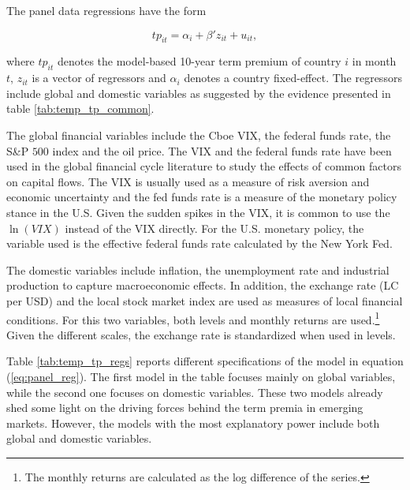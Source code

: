The panel data regressions have the form

\begin{equation} \label{eq:panel_reg}
	tp_{it} = \alpha_{i} + \beta' z_{it} + u_{it},
\end{equation}

where $tp_{it}$ denotes the model-based 10-year term premium of country $i$ in month $t$, $z_{it}$ is a vector of regressors and $\alpha_{i}$ denotes a country fixed-effect. The regressors include global and domestic variables as suggested by the evidence presented in table \ref{tab:temp_tp_common}.

The global financial variables include the Cboe VIX, the federal funds rate, the S\&P $500$ index and the oil price. The VIX and the federal funds rate have been used in the global financial cycle literature \citep[see][]{Rey:2013} to study the effects of common factors on capital flows. The VIX is usually used as a measure of risk aversion and economic uncertainty and the fed funds rate is a measure of the monetary policy stance in the U.S. Given the sudden spikes in the VIX, it is common to use the $\ln \left( VIX \right)$ instead of the VIX directly. For the U.S. monetary policy, the variable used is the effective federal funds rate calculated by the New York Fed. 
 
 The domestic variables include inflation, the unemployment rate and industrial production to capture macroeconomic effects. In addition, the exchange rate (LC per USD) and the local stock market index are used as measures of local financial conditions. For this two variables, both levels and monthly returns are used.\footnote{The monthly returns are calculated as the log difference of the series.} Given the different scales, the exchange rate is standardized when used in levels.

Table \ref{tab:temp_tp_regs} reports different specifications of the model in equation (\ref{eq:panel_reg}). The first model in the table focuses mainly on global variables, while the second one focuses on domestic variables. These two models already shed some light on the driving forces behind the term premia in emerging markets. However, the models with the most explanatory power include both global and domestic variables.
%	
	

